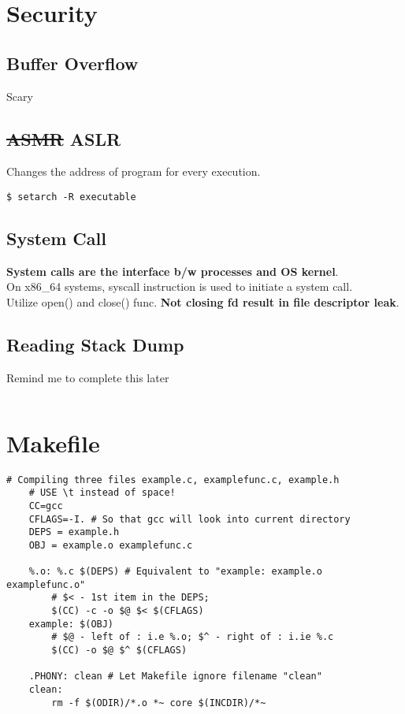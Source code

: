 \documentclass{article}
\begin{document}
\section{Security}

\subsection{Buffer Overflow}
Scary

\subsection{\st{ASMR} ASLR}
Changes the address of program for every execution.
\begin{lstlisting}[style=BashStyle]
    $ setarch -R executable
\end{lstlisting}

\subsection{System Call}
\textbf{System calls are the interface b/w processes and OS kernel}.\\
On x86\_64 systems, syscall instruction is used to initiate a system call.\\
Utilize open() and close() func. \textbf{Not closing fd result in file descriptor leak}.

\subsection{Reading Stack Dump}
Remind me to complete this later
\begin{lstlisting}

\end{lstlisting}

\section{Makefile}
\begin{lstlisting}[style=BashStyle]
    # Compiling three files example.c, examplefunc.c, example.h
    # USE \t instead of space!
    CC=gcc
    CFLAGS=-I. # So that gcc will look into current directory
    DEPS = example.h
    OBJ = example.o examplefunc.c

    %.o: %.c $(DEPS) # Equivalent to "example: example.o examplefunc.o"
        # $< - 1st item in the DEPS; 
        $(CC) -c -o $@ $< $(CFLAGS) 
    example: $(OBJ)
        # $@ - left of : i.e %.o; $^ - right of : i.ie %.c
        $(CC) -o $@ $^ $(CFLAGS)
    
    .PHONY: clean # Let Makefile ignore filename "clean"
    clean:
        rm -f $(ODIR)/*.o *~ core $(INCDIR)/*~
\end{lstlisting}
\end{document}
